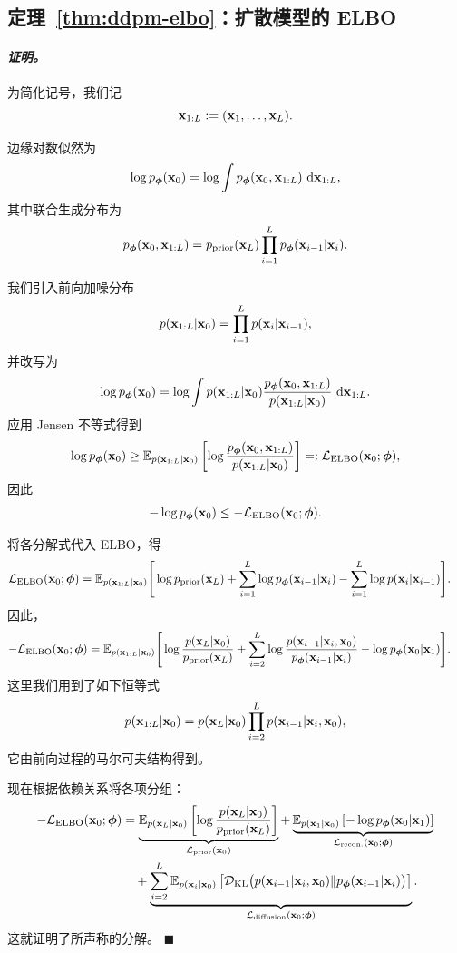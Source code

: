 \subsection{定理~\ref{thm:ddpm-elbo}：扩散模型的 ELBO}\label{app:vlb-proof}

\paragraph{\textit{证明。}} 为简化记号，我们记
\[
{\mathbf{x}}_{1:L}:=({\mathbf{x}}_1,\ldots,{\mathbf{x}}_L).
\]

边缘对数似然为
\[
\log p_{\bm{\phi}}({\mathbf{x}}_0)
=
\log \int p_{\bm{\phi}}({\mathbf{x}}_0,{\mathbf{x}}_{1:L})\,\mathop{}\!\mathrm{d} {\mathbf{x}}_{1:L},
\]
其中联合生成分布为
\[
p_{\bm{\phi}}({\mathbf{x}}_0,{\mathbf{x}}_{1:L})
=
p_{\text{prior}}({\mathbf{x}}_L)\prod_{i=1}^L p_{\bm{\phi}}({\mathbf{x}}_{i-1}| {\mathbf{x}}_i).
\]

我们引入前向加噪分布
\[
p({\mathbf{x}}_{1:L}| {\mathbf{x}}_0)
=
\prod_{i=1}^L p({\mathbf{x}}_i| {\mathbf{x}}_{i-1}),
\]
并改写为
\[
\log p_{\bm{\phi}}({\mathbf{x}}_0)
=
\log \int
p({\mathbf{x}}_{1:L}| {\mathbf{x}}_0)
\frac{p_{\bm{\phi}}({\mathbf{x}}_0,{\mathbf{x}}_{1:L})}{p({\mathbf{x}}_{1:L}| {\mathbf{x}}_0)}
\,\mathop{}\!\mathrm{d} {\mathbf{x}}_{1:L}.
\]
应用 Jensen 不等式得到
\[
\log p_{\bm{\phi}}({\mathbf{x}}_0)
\ge
\mathbb{E}_{p({\mathbf{x}}_{1:L}| {\mathbf{x}}_0)}
\left[
\log
\frac{p_{\bm{\phi}}({\mathbf{x}}_0,{\mathbf{x}}_{1:L})}{p({\mathbf{x}}_{1:L}| {\mathbf{x}}_0)}
\right]
=: \mathcal{L}_{\text{ELBO}}({\mathbf{x}}_0;\bm{\phi}),
\]
因此
\[
-\log p_{\bm{\phi}}({\mathbf{x}}_0)
\le
-\mathcal{L}_{\text{ELBO}}({\mathbf{x}}_0;\bm{\phi}).
\]

将各分解式代入 ELBO，得
\begin{align*}
\mathcal{L}_{\text{ELBO}}({\mathbf{x}}_0;\bm{\phi})
&=
\mathbb{E}_{p({\mathbf{x}}_{1:L}| {\mathbf{x}}_0)}
\Bigg[
\log p_{\text{prior}}({\mathbf{x}}_L)
+
\sum_{i=1}^L \log p_{\bm{\phi}}({\mathbf{x}}_{i-1}| {\mathbf{x}}_i)
-
\sum_{i=1}^L \log p({\mathbf{x}}_i| {\mathbf{x}}_{i-1})
\Bigg].
\end{align*}
因此，
\begin{align*}
-\mathcal{L}_{\text{ELBO}}({\mathbf{x}}_0;\bm{\phi})
&=
\mathbb{E}_{p({\mathbf{x}}_{1:L}| {\mathbf{x}}_0)}
\Bigg[
\log \frac{p({\mathbf{x}}_L| {\mathbf{x}}_0)}{p_{\text{prior}}({\mathbf{x}}_L)}
+
\sum_{i=2}^L
\log \frac{p({\mathbf{x}}_{i-1}| {\mathbf{x}}_i,{\mathbf{x}}_0)}{p_{\bm{\phi}}({\mathbf{x}}_{i-1}| {\mathbf{x}}_i)}
-
\log p_{\bm{\phi}}({\mathbf{x}}_0| {\mathbf{x}}_1)
\Bigg].
\end{align*}
这里我们用到了如下恒等式
\[
p({\mathbf{x}}_{1:L}| {\mathbf{x}}_0)
=
p({\mathbf{x}}_L| {\mathbf{x}}_0)\prod_{i=2}^L p({\mathbf{x}}_{i-1}| {\mathbf{x}}_i,{\mathbf{x}}_0),
\]
它由前向过程的马尔可夫结构得到。

现在根据依赖关系将各项分组：
\begin{align*}
-\mathcal{L}_{\text{ELBO}}({\mathbf{x}}_0;\bm{\phi})
&=
\underbrace{
\mathbb{E}_{p({\mathbf{x}}_L| {\mathbf{x}}_0)}
\left[
\log \frac{p({\mathbf{x}}_L| {\mathbf{x}}_0)}{p_{\text{prior}}({\mathbf{x}}_L)}
\right]
}_{\mathcal{L}_{\text{prior}}({\mathbf{x}}_0)}
+
\underbrace{
\mathbb{E}_{p({\mathbf{x}}_1| {\mathbf{x}}_0)}
\left[
-\log p_{\bm{\phi}}({\mathbf{x}}_0| {\mathbf{x}}_1)
\right]
}_{\mathcal{L}_{\text{recon.}}({\mathbf{x}}_0;\bm{\phi})}
\\
&\quad+
\underbrace{
\sum_{i=2}^L
\mathbb{E}_{p({\mathbf{x}}_i| {\mathbf{x}}_0)}
\left[
\mathcal{D}_{\mathrm{KL}}
\big(
p({\mathbf{x}}_{i-1}| {\mathbf{x}}_i,{\mathbf{x}}_0)
\|
p_{\bm{\phi}}({\mathbf{x}}_{i-1}| {\mathbf{x}}_i)
\big)
\right]
}_{\mathcal{L}_{\text{diffusion}}({\mathbf{x}}_0;\bm{\phi})}.
\end{align*}
这就证明了所声称的分解。
\hfill$\blacksquare$


